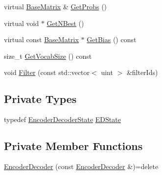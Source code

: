 \begin{DoxyCompactItemize}
\item 
virtual \hyperlink{classamunmt_1_1BaseMatrix}{Base\+Matrix} \& \hyperlink{classamunmt_1_1GPU_1_1EncoderDecoder_aeb1b4060912c9388a1709f524bd63edd}{Get\+Probs} ()
\item 
virtual void $\ast$ \hyperlink{classamunmt_1_1GPU_1_1EncoderDecoder_a1c0f253dc60177dd329097939c2205ba}{Get\+N\+Best} ()
\item 
virtual const \hyperlink{classamunmt_1_1BaseMatrix}{Base\+Matrix} $\ast$ \hyperlink{classamunmt_1_1GPU_1_1EncoderDecoder_a98409af8232092003aff6d1bf0e22ce8}{Get\+Bias} () const 
\item 
size\+\_\+t \hyperlink{classamunmt_1_1GPU_1_1EncoderDecoder_af89773296b4a04108e0d2999ca34bf5e}{Get\+Vocab\+Size} () const 
\item 
void \hyperlink{classamunmt_1_1GPU_1_1EncoderDecoder_ab3e30630d71c914eace68236da36fb44}{Filter} (const std\+::vector$<$ uint $>$ \&filter\+Ids)
\end{DoxyCompactItemize}
\subsection*{Private Types}
\begin{DoxyCompactItemize}
\item 
typedef \hyperlink{classamunmt_1_1GPU_1_1EncoderDecoderState}{Encoder\+Decoder\+State} \hyperlink{classamunmt_1_1GPU_1_1EncoderDecoder_a27acf1f919cac82e29403b5d600e4700}{E\+D\+State}
\end{DoxyCompactItemize}
\subsection*{Private Member Functions}
\begin{DoxyCompactItemize}
\item 
\hyperlink{classamunmt_1_1GPU_1_1EncoderDecoder_a774ab57865bb75d3eff942603a0bef50}{Encoder\+Decoder} (const \hyperlink{classamunmt_1_1GPU_1_1EncoderDecoder}{Encoder\+Decoder} \&)=delete
\end{DoxyCompactItemize}
